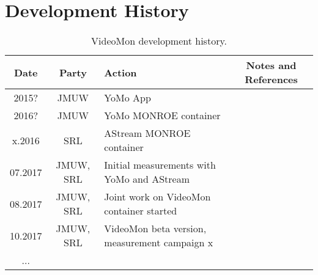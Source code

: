 
\section{Development History}\label{sec:developmenthistory}

\begin{table}[h!]
\centering
\caption{VideoMon development history.}
\begin{tabular}{|c|c|l|c|}
\hline
\textbf{Date} & \textbf{Party} & \textbf{Action} & \textbf{Notes and References} \\
\hline
2015? & \ac{JMUW} & YoMo App & \\
\hline
2016? & \ac{JMUW} & YoMo MONROE container & \\
\hline
x.2016 & \ac{SRL} & AStream MONROE container &\\
\hline
07.2017 & \ac{JMUW}, \ac{SRL} & Initial measurements with YoMo and AStream & \\  
\hline
08.2017 & \ac{JMUW}, \ac{SRL} & Joint work on VideoMon container started & \\  
\hline
10.2017 & \ac{JMUW}, \ac{SRL} & VideoMon beta version, measurement campaign x &\\
\hline
... & & & \\
\hline
\end{tabular}
\label{tab:developmenthistory}
\end{table}